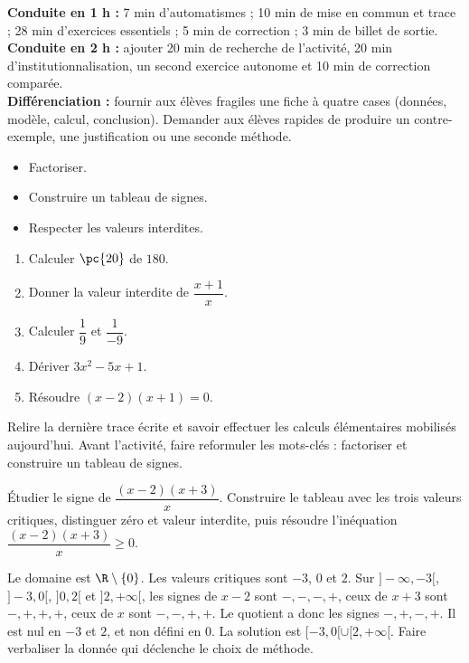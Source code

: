 \ifmxteacher
\begin{method}
\textbf{Conduite en 1 h :} 7 min d'automatismes ; 10 min de mise en commun et trace ; 28 min d'exercices essentiels ; 5 min de correction ; 3 min de billet de sortie.\\
\textbf{Conduite en 2 h :} ajouter 20 min de recherche de l'activité, 20 min d'institutionnalisation, un second exercice autonome et 10 min de correction comparée.\\
\textbf{Différenciation :} fournir aux élèves fragiles une fiche à quatre cases (données, modèle, calcul, conclusion). Demander aux élèves rapides de produire un contre-exemple, une justification ou une seconde méthode.
\end{method}
\fi
{}
\begin{objectives}\begin{itemize}\item Factoriser.\item Construire un tableau de signes.\item Respecter les valeurs interdites.\end{itemize}\end{objectives}
\begin{fluency}\begin{enumerate}\item Calculer $\pc{20}$ de $180$. \item Donner la valeur interdite de $\dfrac{x+1}{x}$. \item Calculer $\dfrac1{9}$ et $\dfrac1{-9}$. \item Dériver $3x^2-5x+1$. \item Résoudre $(x-2)(x+1)=0$. \end{enumerate}\end{fluency}
\begin{prerequisites}Relire la dernière trace écrite et savoir effectuer les calculs élémentaires mobilisés aujourd'hui. Avant l'activité, faire reformuler les mots-clés : factoriser et construire un tableau de signes.\end{prerequisites}

\begin{activity}
Étudier le signe de $\dfrac{(x-2)(x+3)}x$. Construire le tableau avec les trois valeurs critiques, distinguer zéro et valeur interdite, puis résoudre l'inéquation $\dfrac{(x-2)(x+3)}x\geq0$.

\end{activity}
\begin{solution}Le domaine est $\R\setminus\{0\}$. Les valeurs critiques sont $-3$, $0$ et $2$. Sur $]-\infty,-3[$, $]-3,0[$, $]0,2[$ et $]2,+\infty[$, les signes de $x-2$ sont $-,-,-,+$, ceux de $x+3$ sont $-,+,+,+$, ceux de $x$ sont $-,-,+,+$. Le quotient a donc les signes $-,+,-,+$. Il est nul en $-3$ et $2$, et non défini en $0$. La solution est $[-3,0[\cup[2,+\infty[$. Faire verbaliser la donnée qui déclenche le choix de méthode.\end{solution}

